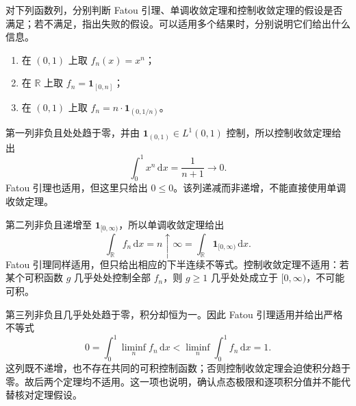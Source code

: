 \begin{exercise}\label{b1:ex:0509}
对下列函数列，分别判断 Fatou 引理、单调收敛定理和控制收敛定理的假设是否满足；若不满足，指出失败的假设。可以适用多个结果时，分别说明它们给出什么信息。
\begin{enumerate}
\item 在 \((0,1)\) 上取 \(f_n(x)=x^n\)；
\item 在 \(\mathbb R\) 上取 \(f_n=\mathbf1_{[0,n]}\)；
\item 在 \((0,1)\) 上取 \(f_n=n\cdot\mathbf1_{(0,1/n)}\)。
\end{enumerate}
\end{exercise}
\begin{solution}
第一列非负且处处趋于零，并由 \(\mathbf1_{(0,1)}\in L^1(0,1)\) 控制，所以控制收敛定理给出
\[
\int_0^1x^n\,\mathrm dx=\frac1{n+1}\longrightarrow0.
\]
Fatou 引理也适用，但这里只给出 \(0\leq0\)。该列递减而非递增，不能直接使用单调收敛定理。

第二列非负且递增至 \(\mathbf1_{[0,\infty)}\)，所以单调收敛定理给出
\[
\int_{\mathbb R}f_n\,\mathrm dx=n\uparrow\infty
=\int_{\mathbb R}\mathbf1_{[0,\infty)}\,\mathrm dx.
\]
Fatou 引理同样适用，但只给出相应的下半连续不等式。控制收敛定理不适用：若某个可积函数 \(g\) 几乎处处控制全部 \(f_n\)，则 \(g\geq1\) 几乎处处成立于 \([0,\infty)\)，不可能可积。

第三列非负且几乎处处趋于零，积分却恒为一。因此 Fatou 引理适用并给出严格不等式
\[
0=\int_0^1\liminf_n f_n\,\mathrm dx
<\liminf_n\int_0^1f_n\,\mathrm dx=1.
\]
这列既不递增，也不存在共同的可积控制函数；否则控制收敛定理会迫使积分趋于零。故后两个定理均不适用。这一项也说明，确认点态极限和逐项积分值并不能代替核对定理假设。
\end{solution}

